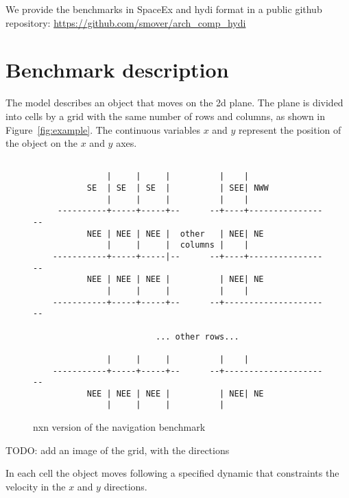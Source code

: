 \documentclass[11pt,twoside,a4paper]{article}
\begin{document}
We provide the benchmarks in SpaceEx and hydi format in a public
github repository: \url{https://github.com/smover/arch_comp_hydi}


\section{Benchmark description}

The model describes an object that moves on the 2d plane.
%
The plane is divided into cells by a grid with the same number of rows
and columns, as shown in Figure~\ref{fig:example}.
%
The continuous variables $x$ and $y$ represent the position of the
object on the $x$ and $y$ axes.

\begin{figure}
\begin{verbatim}

               |     |     |          |    |
           SE  | SE  | SE  |          | SEE| NWW
               |     |     |          |    |
     ----------+-----+-----+--      --+----+-----------------
           NEE | NEE | NEE |  other   | NEE| NE
               |     |     |  columns |    |
    -----------+-----+-----|--      --+----+-----------------
           NEE | NEE | NEE |          | NEE| NE
               |     |     |          |    |
    -----------+-----+-----+--      --+----------------------

                         ... other rows...

               |     |     |          |    |
    -----------+-----+-----+--      --+----------------------
           NEE | NEE | NEE |          | NEE| NE
               |     |     |          |
\end{verbatim}

\caption{nxn version of the navigation benchmark}
\end{figure}

TODO: add an image of the grid, with the directions

In each cell the object moves following a specified dynamic that
constraints the velocity in the $x$ and $y$ directions.
\end{document}
